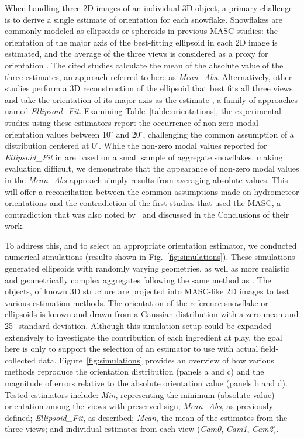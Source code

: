 \documentclass[draft]{agujournal2019}
\begin{document}
When handling three 2D images of an individual 3D object, a primary challenge is to derive a single  estimate of orientation for each snowflake. Snowflakes are commonly modeled as ellipsoids or spheroids in previous MASC studies: the orientation of the major axis of the best-fitting ellipsoid in each 2D image is estimated, and the average of the three views is considered as a proxy for orientation \cite{Garrett_GRL_2015, Gergely_JGRA_2016, Fitch_AMT_2021, Fitch_JGR_2022}. The cited studies calculate the mean of the absolute value of the three estimates, an approach referred to here as \textit{Mean\_Abs}. Alternatively, other studies perform a 3D reconstruction of the ellipsoid that best fits all three views and take the orientation of its major axis as the estimate \cite{Jiang_JAS_2019}, a family of approaches named \textit{Ellipsoid\_Fit}. Examining Table~\ref{table:orientations}, the experimental studies using these estimators report the occurrence of non-zero modal orientation values between 10$^\circ$ and 20$^\circ$, challenging the common assumption of a distribution centered at 0$^\circ$. While the non-zero modal values reported for \textit{Ellipsoid\_Fit} in \cite{Jiang_JAS_2019} are based on a small sample of aggregate snowflakes, making evaluation difficult, we demonstrate that the appearance of non-zero modal values in the \textit{Mean\_Abs} approach simply results from averaging absolute values. This will offer a reconciliation between the common assumptions made on hydrometeor orientations and the contradiction of the first studies that used the MASC, a contradiction that was also noted by~ and discussed in the Conclusions of their work. 

To address this, and to select an appropriate orientation estimator, we conducted numerical simulations (results shown in Fig.~\ref{fig:simulations}). These simulations generated ellipsoids with randomly varying geometries, as well as more realistic and geometrically complex aggregates following the same method as . The objects, of known 3D structure are projected into MASC-like 2D images to test various estimation methods. The orientation of the reference snowflake or ellipsoids is known and drawn from a Gaussian distribution with a zero mean and 25$^\circ$ standard deviation. Although this simulation setup could be expanded extensively to investigate the contribution of each ingredient at play, the goal here is only to support the selection of an estimator to use with actual field-collected data. Figure~\ref{fig:simulations} provides an overview of how various methods reproduce the orientation distribution (panels a and c) and the magnitude of errors relative to the absolute orientation value (panels b and d). Tested estimators include: \textit{Min}, representing the minimum (absolute value) orientation among the views with preserved sign; \textit{Mean\_Abs}, as previously defined; \textit{Ellipsoid\_Fit}, as described; \textit{Mean}, the mean of the estimates from the three views; and individual estimates from each view (\textit{Cam0}, \textit{Cam1}, \textit{Cam2}).
\end{document}
